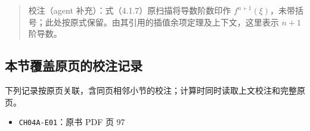 \documentclass[
  10pt,
  fontset=fandol]{ctexart}
\providecommand{\tightlist}{%
  \setlength{\itemsep}{0pt}\setlength{\parskip}{0pt}}
\begin{document}
\begin{quote}
校注（agent 补充）：式（4.1.7）原扫描将导数阶数印作 \(f^{n+1}(\xi)\)，未带括号；此处按原式保留。由其引用的插值余项定理及上下文，这里表示 \(n+1\) 阶导数。
\end{quote}

\subsection{本节覆盖原页的校注记录}\label{ux672cux8282ux8986ux76d6ux539fux9875ux7684ux6821ux6ce8ux8bb0ux5f55}

下列记录按原页关联，含同页相邻小节的校注；计算时同时读取上文校注和完整原页。

\begin{itemize}
\tightlist
\item
  \texttt{CH04A-E01}：原书 PDF 页 97
\end{itemize}
\end{document}
